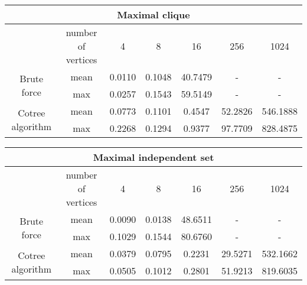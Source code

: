 \begin{center}
    \begin{tabular}{|c|c|c|c|c|c|c|}
        \hline
        \multicolumn{7}{|c|}{Maximal clique}                                                                    \\
        \hline
                                          & number of vertices & 4      & 8      & 16      & 256     & 1024     \\
        \hline

        \multirow{2}{*}{Brute force}      & mean               & 0.0110 & 0.1048 & 40.7479 & -       & -        \\
                                          & max                & 0.0257 & 0.1543 & 59.5149 & -       & -        \\
        \hline
        \multirow{2}{*}{Cotree algorithm} & mean               & 0.0773 & 0.1101 & 0.4547  & 52.2826 & 546.1888 \\
                                          & max                & 0.2268 & 0.1294 & 0.9377  & 97.7709 & 828.4875 \\
        \hline
    \end{tabular}
\end{center}


\begin{center}
    \begin{tabular}{|c|c|c|c|c|c|c|}
        \hline
        \multicolumn{7}{|c|}{Maximal independent set}                                                           \\
        \hline
                                          & number of vertices & 4      & 8      & 16      & 256     & 1024     \\
        \hline

        \multirow{2}{*}{Brute force}      & mean               & 0.0090 & 0.0138 & 48.6511 & -       & -        \\
                                          & max                & 0.1029 & 0.1544 & 80.6760 & -       & -        \\
        \hline
        \multirow{2}{*}{Cotree algorithm} & mean               & 0.0379 & 0.0795 & 0.2231  & 29.5271 & 532.1662 \\
                                          & max                & 0.0505 & 0.1012 & 0.2801  & 51.9213 & 819.6035 \\
        \hline
    \end{tabular}
\end{center}



